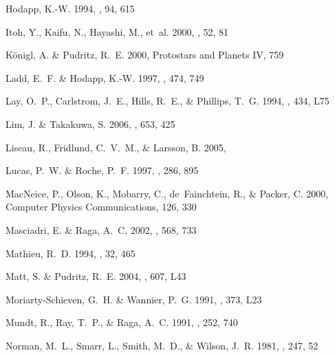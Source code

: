 \documentclass{aa}
\begin{document}
\begin{thebibliography}{80}
{Hodapp}, K.-W. 1994, \apjs, 94, 615

{Itoh}, Y., {Kaifu}, N., {Hayashi}, M., {et~al.} 2000, \pasj, 52, 81

{K\"onigl}, A. \& {Pudritz}, R.~E. 2000, Protostars and Planets IV, 759

{Ladd}, E.~F. \& {Hodapp}, K.-W. 1997, \apj, 474, 749

{Lay}, O.~P., {Carlstrom}, J.~E., {Hills}, R.~E., \& {Phillips}, T.~G. 1994,
  \apjl, 434, L75

{Lim}, J. \& {Takakuwa}, S. 2006, \apj, 653, 425

{Liseau}, R., {Fridlund}, C.~V.~M., \& {Larsson}, B. 2005, \apj

{Lucas}, P.~W. \& {Roche}, P.~F. 1997, \mnras, 286, 895

MacNeice, P., Olson, K., Mobarry, C., de~Fainchtein, R., \& Packer, C. 2000,
  Computer Physics Communications, 126, 330

{Masciadri}, E. \& {Raga}, A.~C. 2002, \apj, 568, 733

{Mathieu}, R.~D. 1994, \araa, 32, 465

{Matt}, S. \& {Pudritz}, R.~E. 2004, \apjl, 607, L43

{Moriarty-Schieven}, G.~H. \& {Wannier}, P.~G. 1991, \apjl, 373, L23

{Mundt}, R., {Ray}, T.~P., \& {Raga}, A.~C. 1991, \aap, 252, 740

{Norman}, M.~L., {Smarr}, L., {Smith}, M.~D., \& {Wilson}, J.~R. 1981, \apj,
  247, 52


\end{thebibliography}
\end{document}
